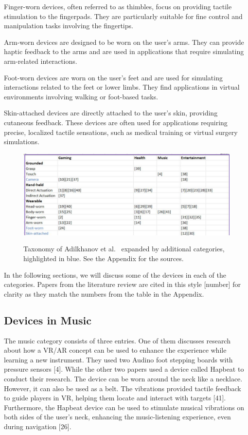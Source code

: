 Finger-worn devices, often referred to as thimbles, focus on providing tactile stimulation to the fingerpads. They are particularly suitable for fine control and manipulation tasks involving the fingertips. 

Arm-worn devices are designed to be worn on the user's arms. They can provide haptic feedback to the arms and are used in applications that require simulating arm-related interactions. 

Foot-worn devices are worn on the user's feet and are used for simulating interactions related to the feet or lower limbs. They find applications in virtual environments involving walking or foot-based tasks. 

Skin-attached devices are directly attached to the user's skin, providing cutaneous feedback. These devices are often used for applications requiring precise, localized tactile sensations, such as medical training or virtual surgery simulations.


\begin{figure}[htbp]
	\includegraphics[width=\columnwidth]{figures/broad.pdf}
	\label{fig:broad}
	\caption{Taxonomy of Adilkhanov et al.~\cite{Adilkhanov22} expanded by additional categories, highlighted in blue. See the Appendix for the sources.}
\end{figure}

In the following sections, we will discuss some of the devices in each of the categories. Papers from the literature review are cited in this style [number] for clarity as they match the numbers from the table in the Appendix. 


\subsection{Devices in Music}
The music category consists of three entries. One of them discusses research about how a VR/AR concept can be used to enhance the experience while learning a new instrument. They used two Audino foot stepping boards with pressure sensors [4]. While the other two papers used a device called Hapbeat to conduct their research. The device can be worn around the neck like a necklace. However, it can also be used as a belt. The vibrations provided tactile feedback to guide players in VR, helping them locate and interact with targets [41].
Furthermore, the Hapbeat device can be used to stimulate musical vibrations on both sides of the user's neck, enhancing the music-listening experience, even during navigation [26].

